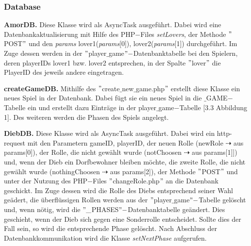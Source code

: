 \documentclass[12pt, a4paper]{article}
\begin{document}

		\subsubsection{Database}
		
\hspace{0,6 cm}\textbf{AmorDB.}
Diese Klasse wird als AsyncTask ausgeführt. Dabei wird eine Datenbankaktualisierung mit Hilfe des PHP$-$Files \textit{setLovers}, der Methode $"$POST$"$ und den \textit{params} lover1(\textit{params}[0]), lover2(\textit{params}[1]) durchgeführt. Im Zuge dessen werden in der $"$player$\_$game$"-$Datenbanktabelle bei den Spielern, deren playerIDs lover1 bzw. lover2 entsprechen, in der Spalte $"$lover$"$ die PlayerID des jeweils andere eingetragen.

\vspace{0,3 cm}

\textbf{createGameDB.}
Mithilfe des $"$create$\_$new$\_$game.php$"$ erstellt diese Klasse ein neues Spiel in der Datenbank. Dabei fügt sie ein neues Spiel in die $\_$GAME$-$Tabelle ein und erstellt dazu Einträge in der player$\_$game$-$Tabelle [3.3 Abbildung 1]. Des weiteren werden die Phasen des Spiels angelegt.

\vspace{0,3 cm}

\textbf{DiebDB.}
Diese Klasse wird als AsyncTask ausgeführt. Dabei wird ein http-request mit den Parametern gameID, playerID, der neuen Rolle 
(newRole $\dashrightarrow$ aus params[0]), der Rolle, die nicht gewählt wurde (notChoosen $\dashrightarrow$ aus params[1]]) und, wenn der Dieb ein Dorfbewohner bleiben möchte, die zweite Rolle, die nicht gewählt wurde (nothingChoosen $\dashrightarrow$ aus params[2]), der Methode $"$POST$"$ und unter der Nutzung des PHP$-$Files $"$changeRole.php$"$ an die Datenbank geschickt. Im Zuge dessen wird die Rolle des Diebs entsprechend seiner Wahl geädert, die überflüssigen Rollen werden aus der $"$player$\_$game$"-$Tabelle gelöscht und, wenn nötig, wird die $"\_$PHASES$"-$Datenbanktabelle geändert. Dies geschieht, wenn der Dieb sich gegen eine Sonderrolle entscheidet. Sollte dies der Fall sein, so wird die entsprechende Phase gelöscht. Nach Abschluss der Datenbankkommunikation wird die Klasse \textit{setNextPhase} aufgerufen.
\end{document}
